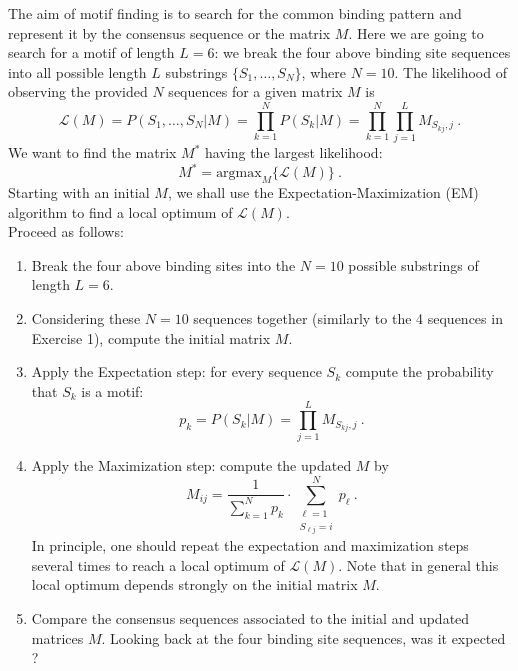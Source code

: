 \documentclass[a4paper,11pt]{article}
\begin{document}
\noindent The aim of motif finding is to search for the common binding pattern and represent it by the consensus sequence or the matrix $M$. Here we are going to search for a motif of length $L=6$: we break the four above binding site sequences into all possible length $L$ substrings $\{S_1, \dots, S_N\}$, where $N=10$. The likelihood of observing the provided $N$ sequences for a given matrix $M$ is
$$
\mathcal{L}(M) = P(S_1,\dots,S_N | M) = \prod_{k=1}^N  P(S_k | M) = \prod_{k=1}^N \prod_{j=1}^L M_{S_{kj},j}~.
$$
We want to find the matrix $M^*$ having the largest likelihood:
$$
M^* = \mbox{argmax}_{M} \{\mathcal{L}(M)\}~.
$$
Starting with an initial $M$, we shall use the Expectation-Maximization (EM) algorithm to find a local optimum of $\mathcal{L}(M)$. \\

\noindent Proceed as follows:

\begin{enumerate}
\item Break the four above binding sites into the $N=10$ possible substrings of length $L=6$.
\item Considering these $N=10$ sequences together (similarly to the 4 sequences in Exercise 1), compute the initial matrix $M$.
\item Apply the Expectation step: for every sequence $S_k$ compute the probability that $S_k$ is a motif:
$$
p_k = P(S_k | M) = \prod_{j=1}^L M_{S_{kj},j}~.
$$
\item Apply the Maximization step: compute the updated $M$ by 
$$
M_{ij} = \frac{1}{\sum_{k=1}^N p_k} \cdot \sum_{\substack{\ell = 1 \\ S_{\ell j} = i }}^N p_\ell~.
$$
In principle, one should repeat the expectation and maximization steps several times to reach a local optimum of $\mathcal{L}(M)$. Note that in general this local optimum depends strongly on the initial matrix $M$.
\item Compare the consensus sequences associated to the initial and updated matrices $M$. Looking back at the four binding site sequences, was it expected ?
\end{enumerate}
\end{document}
